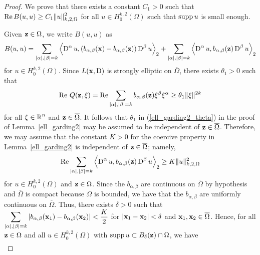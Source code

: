 \begin{proof}
 We prove that there exists a constant $C_1>0$ such that
$\displaystyle \operatorname{Re} B(u,u) \geq C_1 \|u\|_{k,2,\Omega}^2$ for all
$\displaystyle u\in H^{k,2}_0(\Omega)$ such that $\operatorname{supp} u$ is small enough.

Given $\mathbf{z} \in \Omega$, we write $B(u,u)$ as
\begin{equation} \label{ell_garding3_B}
B(u,u) =
\sum_{|\alpha|,|\beta|= k}
\left\langle{\operatorname{D}^\alpha u} , {
\left(b_{\alpha,\beta}(\mathbf{x})-b_{\alpha,\beta}(\mathbf{z})\right)\operatorname{D}^\beta u}\right\rangle_2
+ \sum_{|\alpha|,|\beta|= k}
\left\langle{\operatorname{D}^\alpha u} , {b_{\alpha,\beta}(\mathbf{z}) \operatorname{D}^\beta u}\right\rangle_2
\end{equation}
for $\displaystyle u \in H^{k,2}_0(\Omega)$.
Since $L(\mathbf{x},\operatorname{D})$ is strongly elliptic on $\overline{\Omega}$,
there exists $\theta_1 >0$ such that
\begin{equation} \label{ell_garding3_theta1}
\operatorname{Re}\, Q(\mathbf{z}, \mathbf{\xi}) = \operatorname{Re}
\sum_{|\alpha|,|\beta|=k} b_{\alpha,\beta}(\mathbf{z}) \mathbf{\xi}^\beta
\mathbf{\xi}^\alpha \geq \theta_1 \|\mathbf{\xi}\|^{2k}
\end{equation}
for all $\displaystyle \xi \in \mathbb{R}^n$ and $\mathbf{z}\in \overline{\Omega}$.
It follows that $\theta_1$ in (\ref{ell_garding2_theta}) in
the proof of Lemma~\ref{ell_garding2} may be assumed to be independent of
$\mathbf{z} \in \overline{\Omega}$.  Therefore, we may assume that the
constant $K>0$ for the coercive property in Lemma~\ref{ell_garding2}
is independent of $\mathbf{z} \in \overline{\Omega}$; namely,
\begin{equation} \label{ell_garding_local1}
\operatorname{Re} \sum_{|\alpha|,|\beta|= k}
\left\langle{\operatorname{D}^\alpha u} , {b_{\alpha,\beta}(\mathbf{z}) \operatorname{D}^\beta u}\right\rangle_2 \geq K \|u\|_{k,2,\Omega}^2
\end{equation}
for $\displaystyle u \in H^{k,2}_0(\Omega)$ and $\mathbf{z} \in \Omega$.
Since the $b_{\alpha,\beta}$ are continuous on $\overline{\Omega}$ by
hypothesis and $\overline{\Omega}$ is compact because $\Omega$ is
bounded, we have that the $b_{\alpha,\beta}$ are uniformly continuous on
$\overline{\Omega}$.  Thus, there exists $\delta >0$ such that
$\displaystyle \sum_{|\alpha|,|\beta|= k}
\left|b_{\alpha,\beta}(\mathbf{x}_1)-b_{\alpha,\beta}(\mathbf{x}_2)\right|
< \frac{K}{2}$
for $\displaystyle \left| \mathbf{x}_1- \mathbf{x}_2 \right| < \delta$ and
$\mathbf{x}_1, \mathbf{x}_2 \in \overline{\Omega}$.
Hence, for all $\mathbf{z} \in \Omega$ and all
$\displaystyle u \in H^{k,2}_0(\Omega)$ with
$\operatorname{supp} u \subset B_\delta(\mathbf{z}) \cap \Omega$, we have
\begin{align}

\end{align}
\end{proof}
